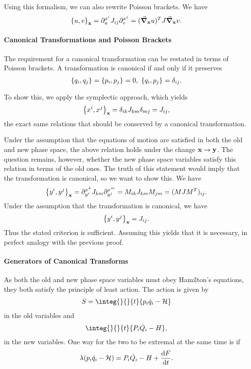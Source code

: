 Using this formalism, we can also rewrite Poisson brackets. We have
\begin{align*}
	\pob[\vb{x}]{u}{v} = \del{x^{i}}{u}J_{ij}\del{x^{j}}{v} = (\grad_{\vb{x}}{u})^{T}J\grad_{\vb{x}}{v}.
\end{align*}

\paragraph{Canonical Transformations and Poisson Brackets}
The requirement for a canonical transformation can be restated in terms of Poisson brackets. A transformation is canonical if and only if it preserves
\begin{align*}
	\pob{q_{i}}{q_{j}} = \pob{p_{i}}{p_{j}} = 0,\ \pob{q_{i}}{p_{j}} = \delta_{ij}.
\end{align*}

To show this, we apply the symplectic approach, which yields
\begin{align*}
	\pob[\vb{x}]{x^{i}}{x^{j}} = \delta_{ik}J_{km}\delta_{mj} = J_{ij},
\end{align*}
the exact same relations that should be conserved by a canonical transformation.

Under the assumption that the equations of motion are satisfied in both the old and new phase space, the above relation holds under the change $\vb{x} \to \vb{y}$. The question remains, however, whether the new phase space variables satisfy this relation in terms of the old ones. The truth of this statement would imply that the transformation is canonical, so we want to show this. We have
\begin{align*}
	\pob[\vb{x}]{y^{i}}{y^{j}} =  \del{x^{k}}{y^{i}}J_{km}\del{x^{m}}{y^{j}} = M_{ik}J_{km}M_{jm} = (MJM^{T})_{ij}.
\end{align*}
Under the assumption that the transformation is canonical, we have
\begin{align*}
	\pob[\vb{x}]{y^{i}}{y^{j}} = J_{ij}.
\end{align*}
Thus the stated criterion is sufficient. Assuming this yields that it is necessary, in perfect analogy with the previous proof.

\paragraph{Generators of Canonical Transforms}
As both the old and new phase space variables must obey Hamilton's equations, they both satisfy the principle of least action. The action is given by
\begin{align*}
	S = \integ{}{}{t}{p_{i}\dot{q}_{i} - \ham}
\end{align*}
in the old variables and
\begin{align*}
	\integ{}{}{t}{P_{i}\dot{Q}_{i} - H},
\end{align*}
in the new variables. One way for the two to be extremal at the same time is if
\begin{align*}
	\lambda(p_{i}\dot{q}_{i} - \ham) = P_{i}\dot{Q}_{i} - H + \dv{F}{t}.
\end{align*}

